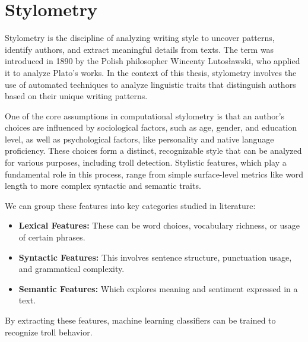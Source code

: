 \documentclass[twoside]{ctuthesis}
\theoremstyle{plain}
\theoremstyle{definition}
\theoremstyle{note}
\begin{document}
\section{Stylometry}
Stylometry is the discipline of analyzing writing style to uncover patterns, identify authors, and extract meaningful details from texts.\cite{Mosteller1964Federalist}\cite{Pascucci2020Misogyny} The term was introduced in 1890 by the Polish philosopher Wincenty Lutosławski, who applied it to analyze Plato's works.\cite{Lutoslawski1898} In the context of this thesis,  stylometry involves the use of automated techniques to analyze linguistic traits that distinguish authors based on their unique writing patterns.\par
One of the core assumptions in computational stylometry is that an author’s choices are influenced by sociological factors, such as age, gender, and education level, as well as psychological factors, like personality and native language proficiency.\cite{Daelemans2013Explanation} These choices form a distinct, recognizable style that can be analyzed for various purposes, including troll detection. Stylistic features, which play a fundamental role in this process, range from simple surface-level metrics like word length to more complex syntactic and semantic traits.\par
We can group these features into key categories studied in literature:
\begin{itemize}
    \item \textbf{Lexical Features:} These can be word choices, vocabulary richness, or usage of certain phrases.
    \item \textbf{Syntactic Features:} This involves sentence structure, punctuation usage, and grammatical complexity.\cite{Sari2018Features}
    \item \textbf{Semantic Features:} Which explores meaning and sentiment expressed in a text.\cite{PerezRosas2018Stylometry}
\end{itemize}
By extracting these features, machine learning classifiers can be trained to recognize troll behavior.
\end{document}
